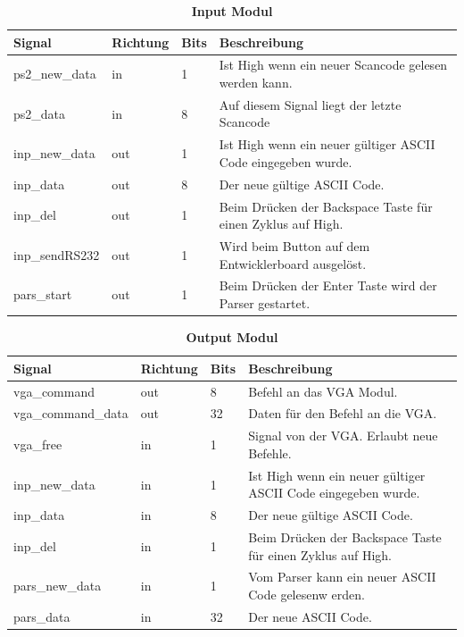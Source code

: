 \begin{table}[h]
 \caption{\textbf{Input Modul}}
 \begin{center}
  \begin{tabular}{|p{4cm}|p{}|p{1cm}|p{9cm}|}
   \hline Signal & Richtung & Bits & Beschreibung\\
   \hline
   ps2\_new\_data & in & 1 & Ist High wenn ein neuer Scancode gelesen werden kann.\\
   ps2\_data & in & 8 & Auf diesem Signal liegt der letzte Scancode\\
   inp\_new\_data & out & 1 & Ist High wenn ein neuer gültiger ASCII Code eingegeben wurde.\\
   inp\_data & out & 8 & Der neue gültige ASCII Code.\\
   inp\_del & out & 1 & Beim Drücken der Backspace Taste für einen Zyklus auf High.\\
   inp\_sendRS232 & out & 1 & Wird beim Button auf dem Entwicklerboard ausgelöst.\\
   pars\_start & out & 1 & Beim Drücken der Enter Taste wird der Parser gestartet.\\ 
   \hline
  \end{tabular}
 \end{center}
\end{table}

 
\begin{table}[!h]
 \caption{\textbf{Output Modul}}
 \begin{center}
  \begin{tabular}{|p{4cm}|p{}|p{1cm}|p{9cm}|}
   \hline Signal & Richtung & Bits & Beschreibung\\
   \hline
   vga\_command & out & 8 & Befehl an das VGA Modul.\\
   vga\_command\_data & out & 32 & Daten für den Befehl an die VGA.\\
   vga\_free & in & 1 & Signal von der VGA. Erlaubt neue Befehle.\\
   inp\_new\_data & in & 1 & Ist High wenn ein neuer gültiger ASCII Code eingegeben wurde.\\
   inp\_data & in & 8 & Der neue gültige ASCII Code.\\
   inp\_del & in & 1 & Beim Drücken der Backspace Taste für einen Zyklus auf High.\\
   pars\_new\_data & in & 1 & Vom Parser kann ein neuer ASCII Code gelesenw erden.\\
   pars\_data & in & 32 & Der neue ASCII Code.\\
   \hline
  \end{tabular}
 \end{center}
\end{table}

